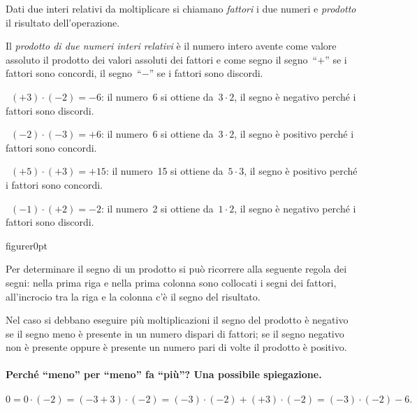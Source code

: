 Dati due interi relativi da moltiplicare si chiamano \emph{fattori} i due numeri e \emph{prodotto} il
risultato dell'operazione.

Il \emph{prodotto di due numeri interi relativi} è il numero intero avente come valore assoluto il prodotto
dei valori assoluti dei fattori e come segno il segno~``$+$'' se i fattori sono concordi,
il segno~``$-$'' se i fattori sono discordi.

\begin{exrig}
 \begin{esempio}
~$(+3)\cdot(-2)=-6$: il numero~6 si ottiene da~$3\cdot2$, il segno è negativo perché i fattori sono discordi.
 \end{esempio}

 \begin{esempio}
~$(-2)\cdot(-3)=+6$: il numero~6 si ottiene da~$3\cdot2$, il segno è positivo perché i fattori sono concordi.
 \end{esempio}
 \begin{esempio}
~$(+5)\cdot(+3)=+15$: il numero~15 si ottiene da~$5\cdot3$, il segno è positivo perché i fattori sono concordi.
 \end{esempio}
 \begin{esempio}
~$(-1)\cdot(+2)=-2$: il numero~2 si ottiene da~$1\cdot2$, il segno è negativo perché i fattori sono discordi.
 \end{esempio}

\end{exrig}

\begin{wrapfloat}{figure}{r}{0pt}

\end{wrapfloat}
Per determinare il segno di un prodotto si può ricorrere alla seguente regola dei segni: nella prima riga e
nella prima colonna sono collocati i segni dei fattori, all'incrocio tra la riga e la colonna c'è il segno
del risultato.

Nel caso si debbano eseguire più moltiplicazioni il segno del prodotto è negativo se il segno meno è presente
in un numero dispari di fattori; se il segno negativo non è presente oppure è presente un numero pari di volte il prodotto è positivo.

\paragraph{Perché ``meno'' per ``meno'' fa ``più''? Una possibile spiegazione.}
\[0=0\cdot (-2) = (-3+3)\cdot (-2) = (-3)\cdot(-2)+(+3)\cdot(-2)=(-3)\cdot(-2)-6.\]

